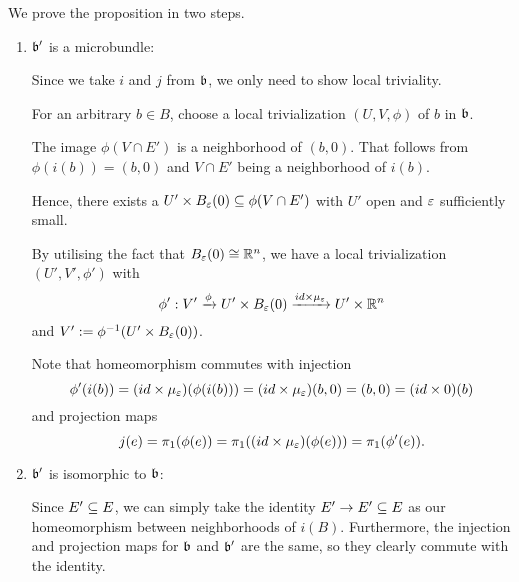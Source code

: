 \begin{myproof}
    We prove the proposition in two steps.
    \begin{enumerate}
        \item $\mathfrak{b}'$ is a microbundle:
        
        Since we take $i$ and $j$ from $\mathfrak{b}$, we only need to show local triviality.

        For an arbitrary $b \in B$, choose a local trivialization $(U, V, \phi)$ of $b$ in $\mathfrak{b}$.
        
        The image $\phi(V \cap E')$ is a neighborhood of $(b, 0)$.
        That follows from $\phi(i(b)) = (b, 0)$ and $V \cap E'$ being a neighborhood of $i(b)$.

        Hence, there exists a $U' \times \ball[\eps] \sub \phi(V \cap E')$ with $U'$ open and $\varepsilon{}$ sufficiently small.

        By utilising the fact that $\ball[\eps] \cong \R^n$, we have a local trivialization $(U', V', \phi')$ with
        \[ \phi': V' \xto{\phi} U' \times \ball[\eps] \xto{id \times \mu_\eps} U' \times \R^n \]
        and $V' := \inv{\phi}(U' \times \ball[\eps])$.

        Note that homeomorphism commutes with injection
        \[ \phi'(i(b)) =  (id \times \mu_\varepsilon{})(\phi(i(b))) = (id \times \mu_\varepsilon{})(b, 0) = (b, 0) = (id \times 0)(b)\]
        and projection maps
        \[ j(e) = \pi_1(\phi(e)) = \pi_1((id \times \mu_\varepsilon{})(\phi(e))) = \pi_1(\phi'(e)). \]
        
        \item $\mathfrak{b}'$ is isomorphic to $\mathfrak{b}$:

        Since $E' \subseteq{} E$, we can simply take the identity $E' \to E' \subseteq{} E$
        as our homeomorphism between neighborhoods of $i(B)$.
        Furthermore, the injection and projection maps for $\mathfrak{b}$ and $\mathfrak{b}'$ are the same,
        so they clearly commute with the identity.
    \end{enumerate}
\end{myproof}